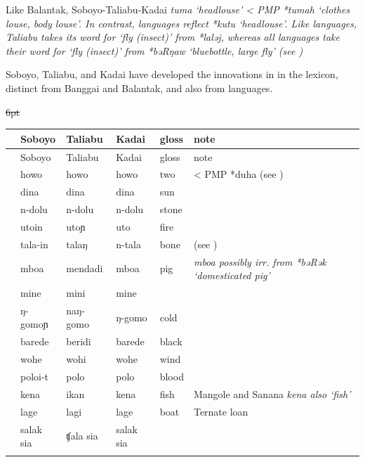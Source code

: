 Like Balantak, Soboyo-Taliabu-Kadai \it{tuma} ‘headlouse’ < PMP
*tumah ‘clothes louse, body louse’.
In contrast,  languages reflect *kutu ‘headlouse’.
Like  languages, Taliabu takes its word for
‘fly (insect)’ from *laləj,
whereas all  languages take their word for ‘fly
(insect)’ from  *bəRŋaw ‘bluebottle,
large fly’ (see )

Soboyo, Taliabu, and Kadai have developed the innovations in 
in the lexicon, distinct from Banggai and Balantak,
and also from  languages.

{\wg\st{6pt}\begin{xltabular}[l]{\linewidth}{>{\hspace{-\tabcolsep}}l<{\hspace{-\tabcolsep}}>{\hspace{-\tabcolsep}\enspace}llllX}
\lsptoprule
{}&	{Soboyo}	&	{Taliabu}	&	{Kadai}	&	{gloss}	&	{note}	\\ \midrule
\endfirsthead
\lsptoprule
					&	{Soboyo}	&	{Taliabu}	&	{Kadai}	&	{gloss}	&	{note}	\\ \midrule
\endhead
&	howo	&	howo	&	howo	&	two	&	< PMP *duha (see )	\\
&	dina	&	dina	&	dina	&	sun	&	\hp{\,}	\\
&	n-dolu	&	n-dolu	&	n-dolu	&	stone	&	\hp{\,}	\\
&	utoin	&	utoɲ	&	uto	&	fire	&	\hp{\,}	\\
&	tala-in	&	talaŋ	&	n-tala	&	bone	&	(see )	\\
&	mboa	&	mendadi	&	mboa	&	pig	&	\it{mboa} possibly irr. from *bəRək `domesticated pig'	\\
&	mine	&	mini	&	mine	&		\\
&	ŋ-gomoɲ	&	naŋ-gomo	&	ŋ-gomo	&	cold	&	\hp{\,}	\\
&	barede	&	beridi	&	barede	&	black	&	\hp{\,}	\\
&	wohe	&	wohi	&	wohe	&	wind	&	\hp{\,}	\\
&	poloi-t	&	polo	&	polo	&	blood	&	\hp{\,}	\\
&	kena	&	ikan	&	kena	&	fish	&	Mangole and Sanana \it{kena} also `fish'	\\
&	lage	&	lagi	&	lage	&	boat	&	Ternate loan	\\
&	salak sia	&	ʧala sia	&	salak sia	&		\\
\lspbottomrule
\end{xltabular}\addtocounter{table}{-1}}

